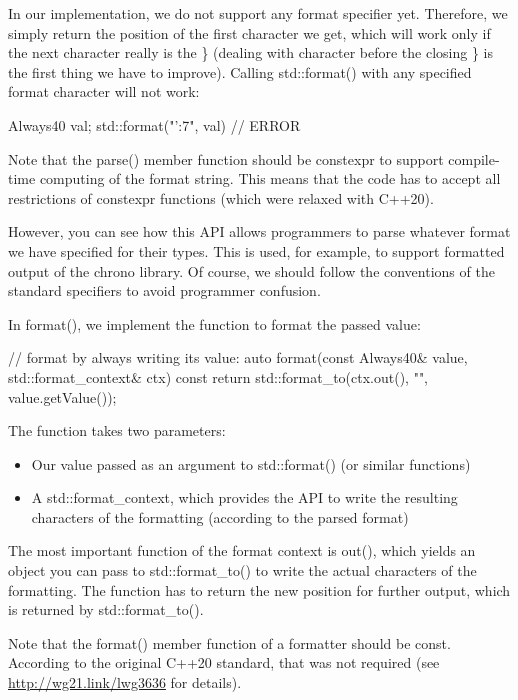 In our implementation, we do not support any format specifier yet. Therefore, we simply return the position of the first character we get, which will work only if the next character really is the \} (dealing with character before the closing \} is the first thing we have to improve). Calling std::format() with any specified format character will not work:

\begin{cpp}
Always40 val;
std::format("'{:7}", val) // ERROR
\end{cpp}

Note that the parse() member function should be constexpr to support compile-time computing of the format string. This means that the code has to accept all restrictions of constexpr functions (which were relaxed with C++20).

However, you can see how this API allows programmers to parse whatever format we have specified for their types. This is used, for example, to support formatted output of the chrono library. Of course, we should follow the conventions of the standard specifiers to avoid programmer confusion.


In format(), we implement the function to format the passed value:

\begin{cpp}
// format by always writing its value:
auto format(const Always40& value, std::format_context& ctx) const {
	return std::format_to(ctx.out(), "{}", value.getValue());
}
\end{cpp}

The function takes two parameters:

\begin{itemize}
\item
Our value passed as an argument to std::format() (or similar functions)

\item
A std::format\_context, which provides the API to write the resulting characters of the formatting (according to the parsed format)
\end{itemize}

The most important function of the format context is out(), which yields an object you can pass to std::format\_to() to write the actual characters of the formatting. The function has to return the new position for further output, which is returned by std::format\_to().

Note that the format() member function of a formatter should be const. According to the original C++20 standard, that was not required (see \url{http://wg21.link/lwg3636} for details).

